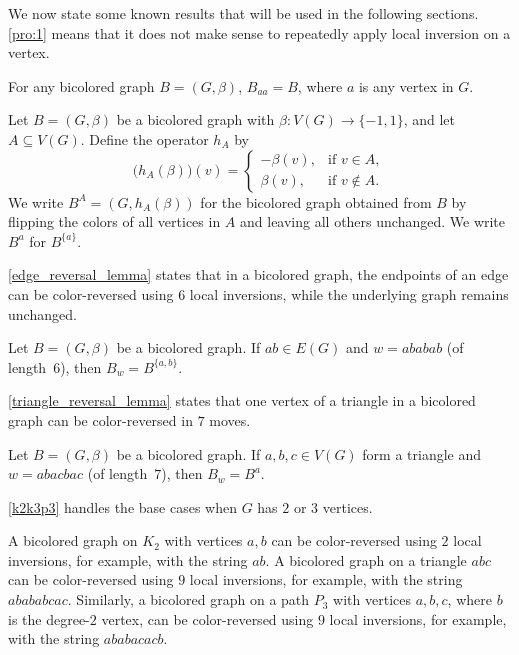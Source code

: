 \documentclass[runningheads,orivec]{llncs}
\begin{document}
We now state some known results that will be used in the following sections. \autoref{pro:1} means that it does not make sense to repeatedly apply local inversion on a vertex.


\begin{proposition}\label{pro:1}
For any bicolored graph $B = (G, \beta)$, $B_{aa}=B$, where $a$ is any vertex in $G$.
\end{proposition}

Let $B=(G,\beta)$ be a bicolored graph with $\beta:V(G)\to\{-1,1\}$, and let $A\subseteq V(G)$. 
Define the operator $h_A$ by
\[
\bigl(h_A(\beta)\bigr)(v)=
\begin{cases}
-\beta(v), & \text{if } v\in A,\\[2pt]
\beta(v),  & \text{if } v\notin A.
\end{cases}
\]
We write $B^{A}=(G, h_A(\beta))$ for the bicolored graph obtained from $B$ by flipping the colors of all vertices in $A$ and leaving all others unchanged. %
We write 
$B^{a}$ for $B^{\{a\}}$.

\autoref{edge_reversal_lemma} states that in a bicolored graph, the endpoints of an edge can be color-reversed using $6$ local inversions, while the underlying graph remains unchanged.
 
\begin{proposition}\label{edge_reversal_lemma}
Let $B=(G,\beta)$ be a bicolored graph. If $ab\in E(G)$ and $w=ababab$ (of length~$6$), then $B_w=B^{\{a,b\}}$.
\end{proposition}

\autoref{triangle_reversal_lemma} states that one vertex of a triangle in a bicolored graph can be color-reversed in $7$ moves. 
\begin{proposition}\label{triangle_reversal_lemma}
Let $B=(G,\beta)$ be a bicolored graph. If $a,b,c\in V(G)$ form a triangle and $w=abacbac$ (of length~$7$), then $B_w=B^{a}$.
\end{proposition}

\autoref{k2k3p3} handles the base cases when $G$ has $2$ or $3$ vertices.

\begin{proposition}\label{k2k3p3}
A bicolored graph on $K_2$ with vertices $a,b$ can be color-reversed using $2$ local inversions, for example, with the string $ab$.
A bicolored graph on a triangle $abc$ can be color-reversed using $9$ local inversions, for example, with the string $abababcac$.
Similarly, a bicolored graph on a path $P_3$ with vertices $a,b,c$, where $b$ is the degree-$2$ vertex, can be color-reversed using $9$ local inversions, for example, with the string $ababacacb$.
\end{proposition}
\end{document}
